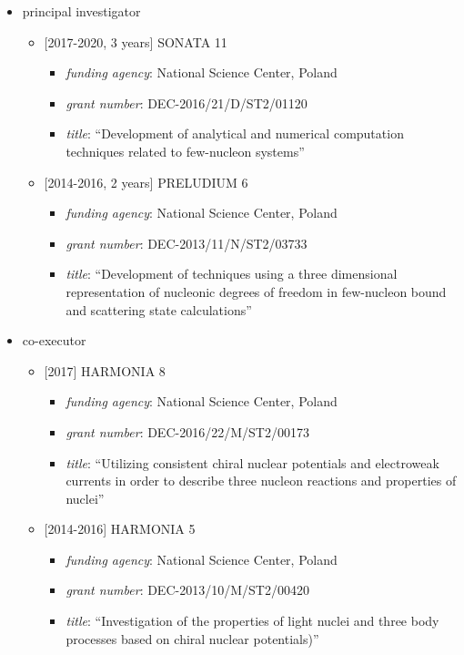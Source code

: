 \documentclass{article}
\providecommand{\tightlist}{%
  \setlength{\itemsep}{0pt}\setlength{\parskip}{0pt}}
\begin{document}
\begin{itemize}
\tightlist
\item
  principal investigator

  \begin{itemize}
  \tightlist
  \item
    {[}2017-2020, 3 years{]} SONATA 11

    \begin{itemize}
    \tightlist
    \item
      \emph{funding agency}: National Science Center, Poland
    \item
      \emph{grant number}: DEC-2016/21/D/ST2/01120
    \item
      \emph{title}: ``Development of analytical and numerical
      computation techniques related to few-nucleon systems''
    \end{itemize}
  \item
    {[}2014-2016, 2 years{]} PRELUDIUM 6

    \begin{itemize}
    \tightlist
    \item
      \emph{funding agency}: National Science Center, Poland
    \item
      \emph{grant number}: DEC-2013/11/N/ST2/03733
    \item
      \emph{title}: ``Development of techniques using a three
      dimensional representation of nucleonic degrees of freedom in
      few-nucleon bound and scattering state calculations''
    \end{itemize}
  \end{itemize}
\item
  co-executor

  \begin{itemize}
  \tightlist
  \item
    {[}2017{]} HARMONIA 8

    \begin{itemize}
    \tightlist
    \item
      \emph{funding agency}: National Science Center, Poland
    \item
      \emph{grant number}: DEC-2016/22/M/ST2/00173
    \item
      \emph{title}: ``Utilizing consistent chiral nuclear potentials and
      electroweak currents in order to describe three nucleon reactions
      and properties of nuclei''
    \end{itemize}
  \item
    {[}2014-2016{]} HARMONIA 5

    \begin{itemize}
    \tightlist
    \item
      \emph{funding agency}: National Science Center, Poland
    \item
      \emph{grant number}: DEC-2013/10/M/ST2/00420
    \item
      \emph{title}: ``Investigation of the properties of light nuclei
      and three body processes based on chiral nuclear potentials)''
    \end{itemize}
  \end{itemize}
\end{itemize}
\end{document}
